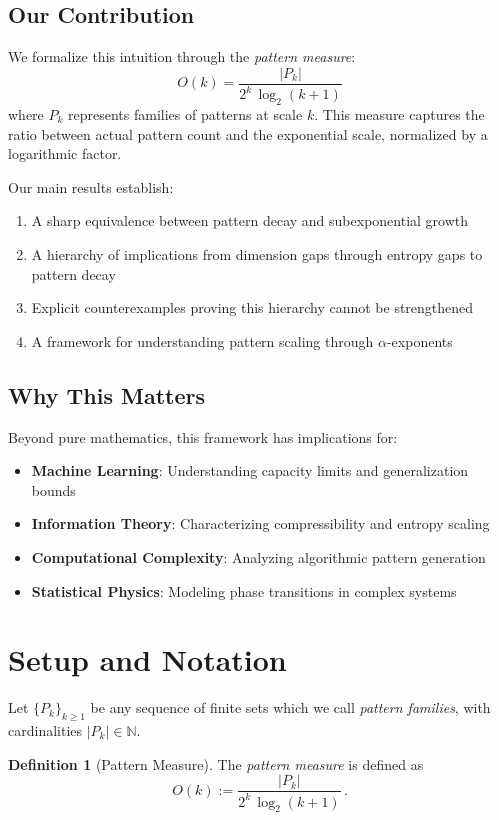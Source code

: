 \documentclass[11pt]{article}
\theoremstyle{definition}
\newtheorem{definition}[theorem]{Definition}
\newcommand{\bbN}{\mathbb{N}}
\begin{document}
\subsection{Our Contribution}

We formalize this intuition through the \emph{pattern measure}:
$$O(k) = \frac{|P_k|}{2^k\,\log_2(k+1)}$$
where $P_k$ represents families of patterns at scale $k$. This measure captures the ratio between actual pattern count and the exponential scale, normalized by a logarithmic factor.

Our main results establish:
\begin{enumerate}
\item A sharp equivalence between pattern decay and subexponential growth
\item A hierarchy of implications from dimension gaps through entropy gaps to pattern decay
\item Explicit counterexamples proving this hierarchy cannot be strengthened
\item A framework for understanding pattern scaling through $\alpha$-exponents
\end{enumerate}

\subsection{Why This Matters}

Beyond pure mathematics, this framework has implications for:
\begin{itemize}
\item \textbf{Machine Learning}: Understanding capacity limits and generalization bounds
\item \textbf{Information Theory}: Characterizing compressibility and entropy scaling
\item \textbf{Computational Complexity}: Analyzing algorithmic pattern generation
\item \textbf{Statistical Physics}: Modeling phase transitions in complex systems
\end{itemize}

\section{Setup and Notation}

Let $\{P_k\}_{k\ge 1}$ be any sequence of finite sets which we call \emph{pattern families}, with cardinalities $|P_k|\in\bbN$. 

\begin{definition}[Pattern Measure]
The \emph{pattern measure} is defined as
\begin{equation}
O(k):= \frac{|P_k|}{2^k\,\log_2(k+1)}\,.
\end{equation}
\end{definition}
\end{document}
